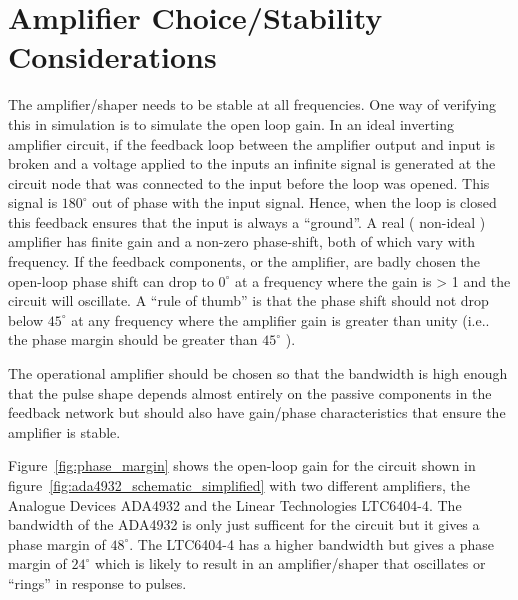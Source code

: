 \documentclass[
12pt, %
a4paper, %
oneside, %
headinclude,footinclude, %
apacite
]{scrartcl}
\begin{document}
\section{Amplifier Choice/Stability Considerations}

The amplifier/shaper needs to be stable at all frequencies. One way of verifying this in simulation is to simulate the open loop gain. In an ideal inverting amplifier circuit, if the feedback loop between the amplifier output and input is broken and a voltage applied to the inputs an infinite signal is generated at the circuit node that was connected to the input before the loop was opened. This signal is $180^\circ$ out of phase with the input signal. Hence, when the loop is closed this feedback ensures that the input is always a ``ground''. A real ( non-ideal ) amplifier has finite gain and a non-zero phase-shift, both of which vary with frequency. If the feedback components, or the amplifier, are badly chosen the open-loop phase shift can drop to $0^\circ$ at a frequency where the gain is > 1 and the circuit will oscillate. A ``rule of thumb'' is that the phase shift should not drop below $45^\circ$ at any frequency where the amplifier gain is greater than unity (i.e.. the phase margin should be greater than $45^\circ$ ).

The operational amplifier should be chosen so that the bandwidth is high enough that the pulse shape depends almost entirely on the passive components in the feedback network but should also have gain/phase characteristics that ensure the amplifier is stable.

Figure~\vref{fig:phase_margin} shows the open-loop gain for the circuit shown in figure~\ref{fig:ada4932_schematic_simplified} with two different amplifiers, the Analogue Devices ADA4932 and the Linear Technologies LTC6404-4. The bandwidth of the ADA4932 is only just sufficent for the circuit but it gives a phase margin of $48^\circ$. The LTC6404-4 has a higher bandwidth but gives a phase margin of  $24^\circ$ which is likely to result in an amplifier/shaper that oscillates or ``rings'' in response to pulses.
\end{document}

